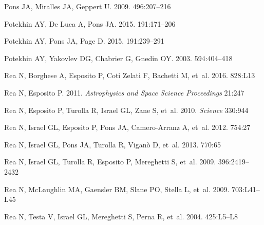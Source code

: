 \documentclass[letterpaper]{ar-1col}
\begin{document}
\begin{thebibliography}{}
{Pons} JA, {Miralles} JA, {Geppert} U. 2009.
\textit{\aap} 496:207--216

{Potekhin} AY, {De Luca} A, {Pons} JA. 2015.
\textit{\ssr} 191:171--206

{Potekhin} AY, {Pons} JA, {Page} D. 2015.
\textit{\ssr} 191:239--291

{Potekhin} AY, {Yakovlev} DG, {Chabrier} G, {Gnedin} OY. 2003.
\textit{\apj} 594:404--418

{Rea} N, {Borghese} A, {Esposito} P, {Coti Zelati} F, {Bachetti} M, et~al.
  2016.
\textit{\apj} 828:L13

{Rea} N, {Esposito} P. 2011.
\textit{Astrophysics and Space Science Proceedings} 21:247

{Rea} N, {Esposito} P, {Turolla} R, {Israel} GL, {Zane} S, et~al. 2010.
\textit{Science} 330:944

{Rea} N, {Israel} GL, {Esposito} P, {Pons} JA, {Camero-Arranz} A, et~al. 2012.
\textit{\apj} 754:27

{Rea} N, {Israel} GL, {Pons} JA, {Turolla} R, {Vigan{\`o}} D, et~al. 2013.
\textit{\apj} 770:65

{Rea} N, {Israel} GL, {Turolla} R, {Esposito} P, {Mereghetti} S, et~al.
  2009{}.
\textit{\mnras} 396:2419--2432

{Rea} N, {McLaughlin} MA, {Gaensler} BM, {Slane} PO, {Stella} L, et~al.
  2009{}.
\textit{\apj} 703:L41--L45

{Rea} N, {Testa} V, {Israel} GL, {Mereghetti} S, {Perna} R, et~al. 2004.
\textit{\aap} 425:L5--L8


\end{thebibliography}
\end{document}
